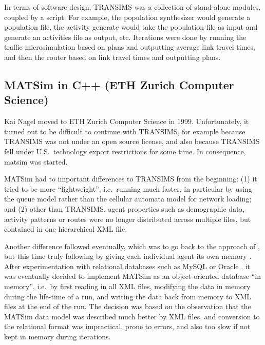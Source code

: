 
In terms of software design, TRANSIMS was a collection of stand-alone modules, coupled by a script.  For example, the population synthesizer would generate a population file, the activity generate would take the population file as input and generate an activities file as output, etc.  Iterations were done by running the traffic microsimulation based on plans and outputting average link travel times, and then the router based on link travel times and outputting plans.


\subsection{MATSim in C++ (ETH Zurich Computer Science)}
\label{sec:history-ethz-phase}


Kai Nagel moved to ETH Zurich Computer Science in 1999.  Unfortunately, it turned out to be difficult to continue with TRANSIMS, for example because TRANSIMS was not under an open source license, and also because TRANSIMS fell under U.S.\ technology export restrictions for some time.  In consequence, \acrshort{matsim} was started.

MATSim had to important differences to TRANSIMS from the beginning: (1) it tried to be more ``lightweight'', i.e.\ running much faster, in particular by using the queue model \citep{GawronPhd,Gawron1998IterativeAlgorithmto} rather than the cellular automata model for network loading; and (2) other than TRANSIMS, agent properties such as demographic data, activity patterns or routes were no longer distributed across multiple files, but contained in one hierarchical XML file.

Another difference followed eventually, which was to go back to the approach of \citet{Nagel1996NRW}, but this time truly following \citet{ArthurBar} by giving each individual agent its own memory \citep{RaneyNagel2006traf-framework}.  After experimentation with relational databases such as MySQL \citep{mysql-wikipedia} or Oracle \citep{oracle}, it was eventually decided to implement MATSim as an object-oriented database ``in memory'', i.e.\ by first reading in all XML files, modifying the data in memory during the life-time of a run, and writing the data back from memory to XML files at the end of the run.  The decision was based on the observation that the MATSim data model was described much better by XML files, and conversion to the relational format was impractical, prone to errors, and also too slow if not kept in memory during iterations. 

